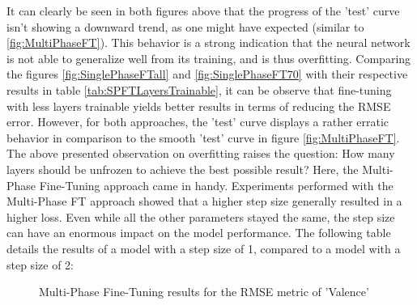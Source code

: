 It can clearly be seen in both figures above that the progress of the 'test' curve isn't showing a downward trend, as one might have expected (similar to  \ref{fig:MultiPhaseFT}). This behavior is a strong indication that the neural network is not able to generalize well from its training, and is thus overfitting.
\newline\newline
Comparing the figures \ref{fig:SinglePhaseFTall} and \ref{fig:SinglePhaseFT70} with their respective results in table \ref{tab:SPFTLayersTrainable}, it can be observe that fine-tuning with less layers trainable yields better results in terms of reducing the RMSE error. However, for both approaches, the 'test' curve displays a rather erratic behavior in comparison to the smooth 'test' curve in figure \ref{fig:MultiPhaseFT}. 
\newline\newline
The above presented observation on overfitting raises the question: How many layers should be unfrozen to achieve the best possible result? \newline
Here, the Multi-Phase Fine-Tuning approach came in handy. Experiments performed with the Multi-Phase FT approach showed that a higher step size generally resulted in a higher loss. Even while all the other parameters stayed the same, the step size can have an enormous impact on the model performance. The following table details the results of a model with a step size of 1, compared to a model with a step size of 2:

\begin{figure}[H]
  \centering
  \hfill
  \caption{Multi-Phase Fine-Tuning results for the RMSE metric of 'Valence'}
\end{figure}

